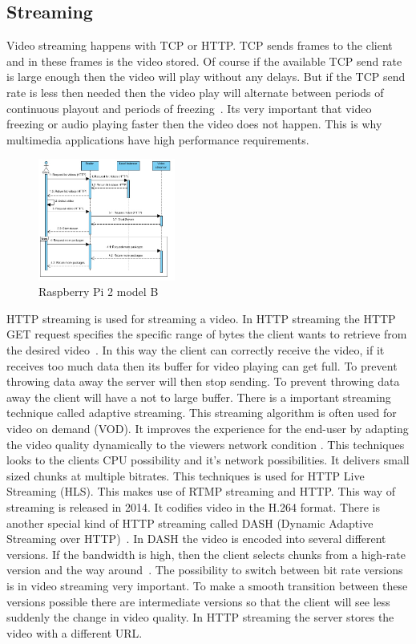 \documentclass{sig-alternate-br}
\begin{document}
\subsection{Streaming}\label{sec:stream}
Video streaming happens with TCP or HTTP. TCP sends frames to the client and in these frames is the video stored. Of course if the available TCP send rate is large enough then the video will play without any delays. But if the TCP send rate is less then needed then the video play will alternate between periods of continuous playout and periods of freezing~\cite{computer-networking}. Its very important that video freezing or audio playing faster then the video does not happen. This is why multimedia applications have high performance requirements. 
\begin{figure}[H]
	\centering 
	\includegraphics[width=0.4\textwidth]{VideoStreaming.jpg}
	\caption{Raspberry Pi 2 model B}
	\label{fig:stream} %
\end{figure}
HTTP streaming is used for streaming a video. In HTTP streaming the HTTP GET request specifies the specific range of bytes the client wants to retrieve from the desired video~\cite{computer-networking}. In this way the client can correctly receive the video, if it receives too much data then its buffer for video playing can get full. To prevent throwing data away the server will then stop sending. To prevent throwing data away the client will have a not to large buffer. \newline
There is a important streaming technique called adaptive streaming. This streaming algorithm is often used for video on demand (VOD). It improves the experience for the end-user by adapting the video quality dynamically to the viewers network condition \cite{ffmpeg}. This techniques looks to the clients CPU possibility and it's network possibilities. It delivers small sized chunks at multiple bitrates. This techniques is used for HTTP Live Streaming (HLS). This makes use of RTMP streaming and HTTP. This way of streaming is released in 2014. It codifies video in the H.264 format.\newline
There is another special kind of HTTP streaming called DASH (Dynamic Adaptive Streaming over HTTP)~\cite{computer-networking}. In DASH the video is encoded into several different versions. If the bandwidth is high, then the client selects chunks from a high-rate version and the way around~\cite{computer-networking}. The possibility to switch between bit rate versions is in video streaming very important. To make a smooth transition between these versions possible there are intermediate versions so that the client will see less suddenly the change in video quality. In HTTP streaming the server stores the video with a different URL.   
\end{document}
